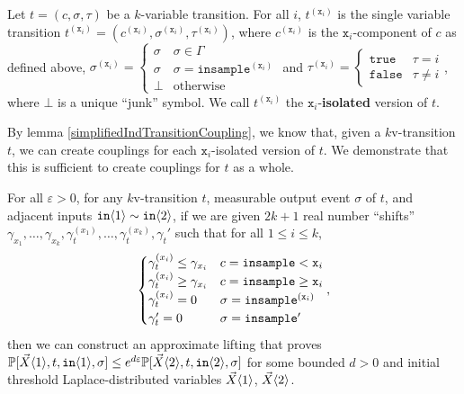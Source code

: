 \begin{defn}
    Let $t = (c, \sigma, \tau)$ be a $k$-variable transition. For all $i$, $t^{(\texttt{x}_i)}$ is the single variable transition $t^{(\texttt{x}_i)} = (c^{(\texttt{x}_i)}, \sigma^{(\texttt{x}_i)}, \tau^{(\texttt{x}_i)})$, where $c^{(\texttt{x}_i)}$ is the $\texttt{x}_i$-component of $c$ as defined above, $\sigma^{(\texttt{x}_i)} = \begin{cases}
        \sigma & \sigma \in \Gamma\\
        \sigma & \sigma = \texttt{insample}^{(\texttt{x}_i)}\\
        \bot & \text{otherwise}
    \end{cases}$ and $\tau^{(\texttt{x}_i)} = \begin{cases}
        \texttt{true} & \tau = i\\
        \texttt{false} & \tau \neq i
    \end{cases}$, where $\bot$ is a unique ``junk'' symbol. We call $t^{(\texttt{x}_i)}$ the $\texttt{x}_i$-\textbf{isolated} version of $t$. 
\end{defn}

By lemma \ref{simplifiedIndTransitionCoupling}, we know that, given a $k$v-transition $t$, we can create couplings for each $\texttt{x}_i$-isolated version of $t$. We demonstrate that this is sufficient to create couplings for $t$ as a whole. 

\begin{lemma}\label{simplifiedMvParallelCouplingsLemma}
    For all $\varepsilon>0$, for any $k$v-transition $t$, measurable output event $\sigma$ of $t$, and adjacent inputs $\texttt{in}\brangle{1}\sim\texttt{in}\brangle{2}$, if we are given $2k+1$ real number ``shifts'' $\gamma_{x_1}, \ldots, \gamma_{x_k}, \gamma_t^{(x_1)}, \ldots, \gamma_t^{(x_k)}, \gamma_t'$ such that for all $1\leq i\leq k$, \[
        \begin{cases}
            \gamma_t^{(x_i)}\leq\gamma_{x_i} & c = \lguard[\texttt{x}_i]\\
            \gamma_t^{(x_i)}\geq\gamma_{x_i} & c = \gguard[\texttt{x}_i]\\
            \gamma_t^{(x_i)}=0 & \sigma = \texttt{insample}^{(\texttt{x}_i)}\\
            \gamma_t'=0 & \sigma = \texttt{insample}'
      \end{cases},
      \]
      then we can construct an approximate lifting that proves $\PP[\vec{X}\brangle{1}, t, \texttt{in}\brangle{1}, \sigma]\leq e^{d\varepsilon}\PP[\vec{X}\brangle{2}, t, \texttt{in}\brangle{2}, \sigma]$ for some bounded $d>0$ and initial threshold Laplace-distributed variables $\vec{X}\brangle{1}$, $\vec{X}\brangle{2}$. 
\end{lemma}


